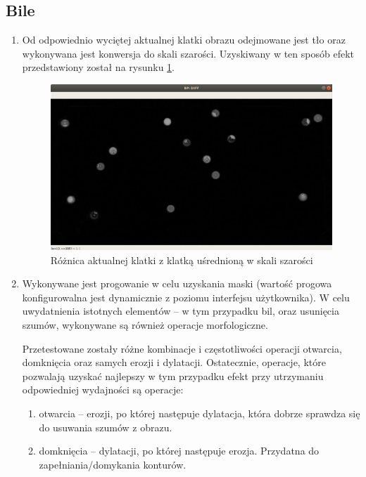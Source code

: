 \documentclass[12pt]{article}
\begin{document}
\subsection{Bile}

\begin{enumerate} [noitemsep]

    \item Od odpowiednio wyciętej aktualnej klatki obrazu odejmowane jest tło  oraz wykonywana jest konwersja do skali szarości. Uzyskiwany w ten sposób efekt przedstawiony został na rysunku \ref{bp_diff}.

    \begin{figure}[!ht]
        \centering
        \includegraphics[width=15cm]{./images/obrazki/bp/bp_diff.png}
        \caption{Różnica aktualnej klatki z klatką uśrednioną w skali szarości}
        \label{bp_diff}
    \end{figure}


    \item Wykonywane jest progowanie w celu uzyskania maski (wartość progowa konfigurowalna jest dynamicznie z poziomu interfejsu użytkownika). W celu uwydatnienia istotnych elementów – w tym przypadku bil, oraz usunięcia szumów, wykonywane są również operacje morfologiczne.
    \vspace{0.5cm}
    
    Przetestowane zostały różne kombinacje i częstotliwości operacji otwarcia, domknięcia oraz samych erozji i dylatacji. Ostatecznie, operacje, które pozwalają uzyskać najlepszy w tym przypadku efekt przy utrzymaniu odpowiedniej wydajności są operacje:

    \begin{enumerate}
        \item otwarcia – erozji, po której następuje dylatacja, która dobrze sprawdza się do usuwania szumów z obrazu.
        \item domknięcia – dylatacji, po której następuje erozja. Przydatna do zapełniania/domykania konturów.
    \end{enumerate}


\end{enumerate}
\end{document}
